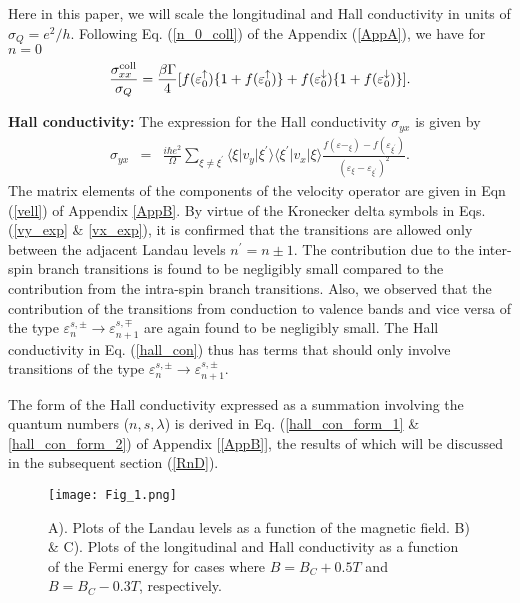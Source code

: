 \documentclass[prb,twocolumn]{revtex4-1}
\begin{document}
Here in this paper, we will scale the longitudinal and Hall conductivity in units of $\sigma_Q=e^2/h$. Following Eq. (\ref{n_0_coll}) of the Appendix (\ref{AppA}), we have for $n=0$
\begin{eqnarray}\label{coll2}
\frac{\sigma_{xx}^{\rm coll}}{\sigma_Q}=\frac{\beta\Gamma}{4}[f(\varepsilon_0^\uparrow)\{1+f(\varepsilon_0^\uparrow)\}+f(\varepsilon_0^\downarrow)\{1+f(\varepsilon_0^\downarrow)\}].
\end{eqnarray}

{\bf Hall conductivity:}
The expression for the Hall conductivity  $\sigma_{yx}$ is given by \cite{vasilo, Peet, wang}
\begin{eqnarray}\label{hall_con}
	\sigma_{yx} & = & \frac{i\hbar e^2}{\Omega }\sum \limits_{\xi \neq \xi^{\prime}}
	\langle \xi\vert v_y\vert\xi^{\prime} \rangle
	\langle \xi^{\prime}\vert v_x\vert\xi \rangle\frac{f(\varepsilon-_{\xi}) - 
		f(\varepsilon_{\xi^{\prime}})}{(\varepsilon_{\xi}-\varepsilon_{\xi^\prime})^2}.
\end{eqnarray}
The matrix elements of the components of the velocity operator are given 
in Eqn (\ref{vell}) of Appendix \ref{AppB}. By virtue of the Kronecker delta symbols in 
Eqs. (\ref{vy_exp} \& \ref{vx_exp}), it is confirmed that the 
transitions are allowed only between the adjacent Landau 
levels $n^\prime = n \pm 1 $. The contribution due to the inter-spin branch transitions is found to be negligibly small compared to the contribution from the intra-spin branch transitions. Also, we observed that the contribution of the transitions from conduction to valence bands and vice versa of the type $\varepsilon_{n}^{s,\pm}\rightarrow \varepsilon_{n+1}^{s,\mp}$ are again found to be negligibly small. The  Hall conductivity in Eq. (\ref{hall_con}) thus has terms that should only involve transitions of the type $\varepsilon_{n}^{s,\pm}\rightarrow \varepsilon_{n+1}^{s,\pm}$. 

The form of the Hall conductivity expressed as a summation involving the quantum numbers ($n,s,\lambda$) is derived in Eq. (\ref{hall_con_form_1} \& \ref{hall_con_form_2}) of Appendix [\ref{AppB}], the results of which will be discussed in the subsequent section (\ref{RnD}).
\begin{figure}[b]
	\texttt{[image: Fig\_1.png]}
	\caption{A). Plots of the Landau levels as a function of the magnetic field. B) \& C). Plots of the longitudinal and Hall conductivity as a function of the Fermi energy for cases where $B=B_C+0.5T$ and $B=B_C-0.3T$, respectively.}
	\label{Fig3}
\end{figure}
\end{document}
